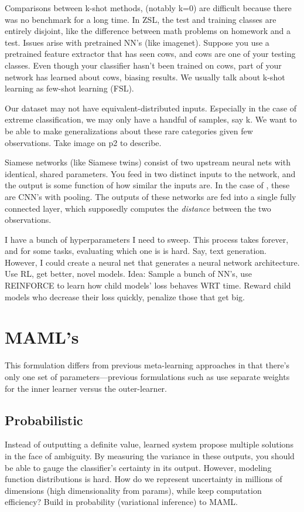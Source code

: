 \documentclass[american]{IEEEtran}   	%
\begin{document}
Comparisons between k-shot methods, (notably k=0) are difficult because there was no benchmark for a long time\cite{Xian_2017}.
In ZSL, the test and training classes are entirely disjoint, like the difference between math problems on homework and a test.
Issues arise with pretrained NN's (like imagenet).
Suppose you use a pretrained feature extractor that has seen cows, and cows are one of your testing classes.
Even though your classifier hasn't been trained on cows, part of your network has learned about cows, biasing results.
We usually talk about k-shot learning as few-shot learning (FSL)\cite{Wang_2020}.

Our dataset may not have equivalent-distributed inputs.
Especially in the case of extreme classification, we may only have a handful of samples, say k.
We want to be able to make generalizations about these rare categories given few observations\cite{Koch2015SiameseNN}.
Take image on p2\cite{Koch2015SiameseNN} to describe.

Siamese networks (like Siamese twins) consist of two upstream neural nets with identical, shared parameters.
You feed in two distinct inputs to the network, and the output is some function of how similar the inputs are.
In the case of \cite{Koch2015SiameseNN}, these are CNN's with pooling.
The outputs of these networks are fed into a single fully connected layer, which supposedly computes the \textit{distance} between the two observations.

I have a bunch of hyperparameters I need to sweep.
This process takes forever, and for some tasks, evaluating which one is  is hard.
Say, text generation.
However, I could create a neural net that generates a neural network architecture.
Use RL, get better, novel models\cite{zoph2016neural}.
Idea: Sample a bunch of NN's, use REINFORCE to learn how child models' loss behaves WRT time.
Reward child models who decrease their loss quickly, penalize those that get big.







\section{MAML's}
This formulation differs from previous meta-learning approaches in that there's only one set of parameters---previous formulations such as \cite{munkhdalai2017meta} use separate weights for the inner learner versus the outer-learner.
\subsection{Probabilistic}
Instead of outputting a definite value, learned system propose multiple solutions in the face of ambiguity\cite{finn2018probabilistic}.
By measuring the variance in these outputs, you should be able to gauge the classifier's certainty in its output.
However, modeling function distributions is hard.
How do we represent uncertainty in millions of dimensions (high dimensionality from params), while keep computation efficiency?
Build in probability (variational inference) to MAML.
\end{document}
